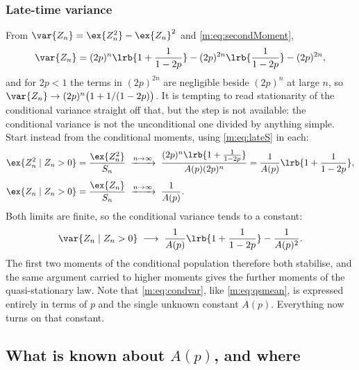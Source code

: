 \subsubsection{Late-time variance}

From $\var{Z_n} = \ex{Z_n^2}-\ex{Z_n}^2$ and \cref{m:eq:secondMoment},
\begin{equation*}
\var{Z_n} = (2p)^n\lrb{1+\frac{1}{1-2p}} - (2p)^{2n}\lrb{\frac{1}{1-2p}} - (2p)^{2n},
\end{equation*}
and for $2p<1$ the terms in $(2p)^{2n}$ are negligible beside $(2p)^n$ at large
$n$, so $\var{Z_n}\to(2p)^n\bigl(1+1/(1-2p)\bigr)$. It is tempting to read
stationarity of the conditional variance straight off that, but the step is not
available: the conditional variance is not the unconditional one divided by
anything simple. Start instead from the conditional moments, using
\cref{m:eq:lateS} in each:
\begin{align*}
\ex{Z_n^2\mid Z_n>0} &= \frac{\ex{Z_n^2}}{S_n}
\;\xrightarrow{n\to\infty}\;
\frac{(2p)^n\lrb{1+\frac{1}{1-2p}}}{A(p)(2p)^n}
= \frac{1}{A(p)}\lrb{1+\frac{1}{1-2p}},\\[4pt]
\ex{Z_n\mid Z_n>0} &= \frac{\ex{Z_n}}{S_n}
\;\xrightarrow{n\to\infty}\;
\frac{1}{A(p)} .
\end{align*}
Both limits are finite, so the conditional variance tends to a constant:
\begin{equation}
\label{m:eq:condvar}
\var{Z_n\mid Z_n>0} \;\longrightarrow\;
\frac{1}{A(p)}\lrb{1+\frac{1}{1-2p}} - \frac{1}{A(p)^2} .
\end{equation}
The first two moments of the conditional population therefore both stabilise, and
the same argument carried to higher moments gives the further moments of the
quasi-stationary law. Note that \cref{m:eq:condvar}, like \cref{m:eq:qsmean}, is
expressed entirely in terms of $p$ and the single unknown constant $A(p)$.
Everything now turns on that constant.

\subsection{What is known about \texorpdfstring{$A(p)$}{A(p)}, and where}
\label{m:sec:Apinterface}

